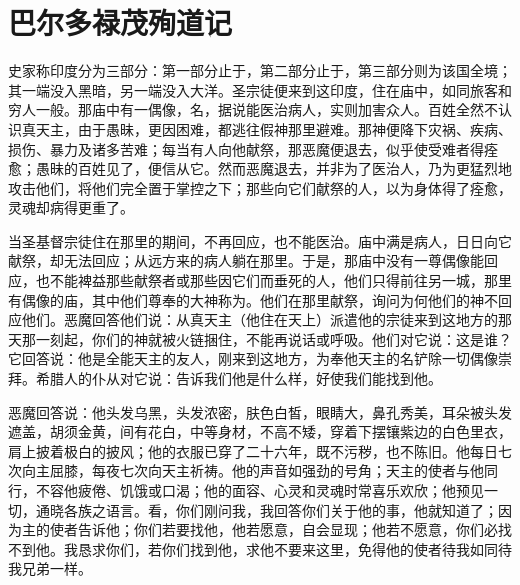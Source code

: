
\chapter{巴尔多禄茂殉道记}


史家称印度分为三部分：第一部分止于，第二部分止于，第三部分则为该国全境；其一端没入黑暗，另一端没入大洋。圣宗徒便来到这印度，住在庙中，如同旅客和穷人一般。那庙中有一偶像，名，据说能医治病人，实则加害众人。百姓全然不认识真天主，由于愚昧，更因困难，都逃往假神那里避难。那神便降下灾祸、疾病、损伤、暴力及诸多苦难；每当有人向他献祭，那恶魔便退去，似乎使受难者得痊愈；愚昧的百姓见了，便信从它。然而恶魔退去，并非为了医治人，乃为更猛烈地攻击他们，将他们完全置于掌控之下；那些向它们献祭的人，以为身体得了痊愈，灵魂却病得更重了。\par

当圣基督宗徒住在那里的期间，不再回应，也不能医治。庙中满是病人，日日向它献祭，却无法回应；从远方来的病人躺在那里。于是，那庙中没有一尊偶像能回应，也不能裨益那些献祭者或那些因它们而垂死的人，他们只得前往另一城，那里有偶像的庙，其中他们尊奉的大神称为。他们在那里献祭，询问为何他们的神不回应他们。恶魔回答他们说：从真天主（他住在天上）派遣他的宗徒来到这地方的那天那一刻起，你们的神就被火链捆住，不能再说话或呼吸。他们对它说：这是谁？它回答说：他是全能天主的友人，刚来到这地方，为奉他天主的名铲除一切偶像崇拜。希腊人的仆从对它说：告诉我们他是什么样，好使我们能找到他。\par

恶魔回答说：他头发乌黑，头发浓密，肤色白皙，眼睛大，鼻孔秀美，耳朵被头发遮盖，胡须金黄，间有花白，中等身材，不高不矮，穿着下摆镶紫边的白色里衣，肩上披着极白的披风；他的衣服已穿了二十六年，既不污秽，也不陈旧。他每日七次向主屈膝，每夜七次向天主祈祷。他的声音如强劲的号角；天主的使者与他同行，不容他疲倦、饥饿或口渴；他的面容、心灵和灵魂时常喜乐欢欣；他预见一切，通晓各族之语言。看，你们刚问我，我回答你们关于他的事，他就知道了；因为主的使者告诉他；你们若要找他，他若愿意，自会显现；他若不愿意，你们必找不到他。我恳求你们，若你们找到他，求他不要来这里，免得他的使者待我如同待我兄弟一样。\par

